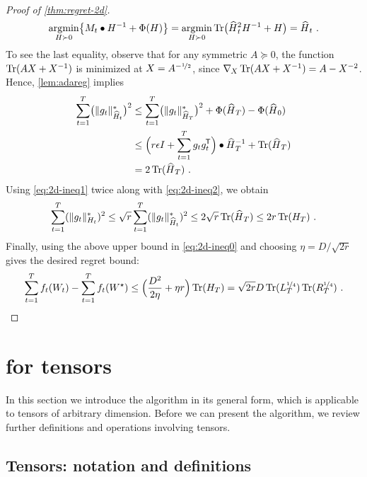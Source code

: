 \begin{proof}[Proof of \cref{thm:regret-2d}]
\begin{align*}
\operatorname*{arg\!\min}_{H \succ 0} \mathopen{}\big\{ M_t \bullet H^{-1} + \Phi(H) \big\}
	= \operatorname*{arg\!\min}_{H \succ 0} \operatorname*{Tr}\mathopen{}\big( \smash{\widehat{H}}_t^2 H^{-1} + H \big)
	= \smash{\widehat{H}}_t ~.
\end{align*}
To see the last equality, observe that for any symmetric $A \succeq 0$, the function $\operatorname*{Tr}(AX+X^{-1})$ is minimized at $X = A^{-{\smash{\nicefrac{1}{2}}}}$, since $\nabla_X \trace(AX+X^{-1}) = A-X^{-2}$.
Hence, \cref{lem:adareg} implies
\begin{align} \label{eq:2d-ineq2}
\sum_{t=1}^T \mathopen{}\big(\|g_t\|_{\widehat{H}_t}^*\big)^2
&\le
\sum_{t=1}^T \mathopen{}\big(\|g_t\|_{\widehat{H}_T}^*\big)^2 + \Phi(\smash{\widehat{H}}_T) - \Phi(\smash{\widehat{H}}_0)
\notag\\
&\le
\mathopen{}\Big( r \epsilon I + \sum_{t=1}^T g_t g_t^{\mkern-1.5mu\scriptstyle\mathsf{T}} \Big) \bullet \smash{\widehat{H}}_T^{-1} + \operatorname*{Tr}(\smash{\widehat{H}}_T)
\\
&=
2\operatorname*{Tr}(\smash{\widehat{H}}_T) ~ .  \notag
\end{align}
%
Using \cref{eq:2d-ineq1} twice along with \cref{eq:2d-ineq2}, we obtain
\begin{align*}
\sum_{t=1}^T (\|g_t\|_{H_t}^*)^2
\le
\sqrt{r} \sum_{t=1}^T (\|g_t\|_{\widehat{H}_t}^*)^2
\le
2\sqrt{r} \operatorname*{Tr}(\smash{\widehat{H}}_T)
\le
2r \operatorname*{Tr}(H_T) ~ .
\end{align*}
Finally, using the above upper bound in \cref{eq:2d-ineq0} and choosing $\eta = D/\sqrt{2r}$ gives the
desired regret bound:
\begin{align*}
\sum_{t=1}^T f_t(W_t) - \sum_{t=1}^T f_t(W^\star)
\le
\mathopen{}\Big(\frac{D^2}{2\eta} + \eta r\Big) \operatorname*{Tr}(H_T)
=
\sqrt{2r} D \operatorname*{Tr}(L_T^{\smash{\nicefrac{1}{4}}}) \operatorname*{Tr}(R_T^{\smash{\nicefrac{1}{4}}}) ~ .
\end{align*}
\end{proof}



\section{\NAME for tensors}


In this section we introduce the \NAME algorithm in its general form, which
is applicable to tensors of arbitrary dimension.  Before we can
present the algorithm, we review further definitions and operations involving
tensors.

\subsection{Tensors: notation and definitions}

